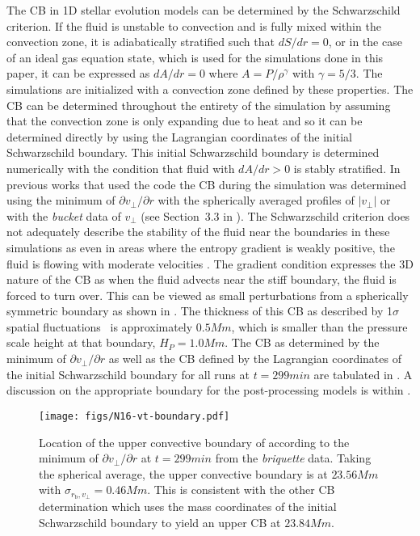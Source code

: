 \documentclass[fleqn,usenatbib]{mnras}
\newcommand{\ppmstar}{\code{PPMstar}}
\begin{document}
The CB in 1D stellar evolution models can be determined by the Schwarzschild
criterion. If the fluid is unstable to convection and is fully mixed within the
convection zone, it is adiabatically stratified such that $dS/dr = 0$, or in the
case of an ideal gas equation state, which is used for the simulations done in
this paper, it can be expressed as $dA/dr = 0$ where $A = P / \rho^{\gamma}$
with $\gamma = 5/3$. The \ppmstar{} simulations are initialized with a
convection zone defined by these properties. The CB can be determined throughout
the entirety of the simulation by assuming that the convection zone is only
expanding due to heat and so it can be determined directly by using the
Lagrangian coordinates of the initial Schwarzschild boundary. This initial
Schwarzschild boundary is determined numerically with the condition that fluid
with $dA/dr > 0$ is stably stratified. In previous works that used the \ppmstar{}
code \citep{Jones:2017kc, Andrassy:19,Denissenkov:19} the CB during the
simulation was determined using the minimum of $\partial v_{\perp} / \partial r$
with the spherically averaged profiles of $|v_{\perp}|$ or with the
\textit{bucket} data of $v_{\perp}$ (see Section~3.3 in \citet{Jones:2017kc}).
The Schwarzschild criterion does not adequately describe the stability of the
fluid near the boundaries in these simulations as even in areas where the
entropy gradient is weakly positive, the fluid is flowing with moderate
velocities \citep{Jones:2017kc}. The gradient condition expresses the 3D nature
of the CB as when the fluid advects near the stiff boundary, the fluid is forced
to turn over. This can be viewed as small perturbations from a spherically
symmetric boundary as shown in . The thickness of this CB as
described by 1$\sigma$ spatial fluctuations~\citep[Fig.~17 in][]{Jones:2017kc}
is approximately $\unit{0.5}{Mm}$, which is smaller than the pressure scale
height at that boundary, $H_{P} = \unit{1.0}{Mm}$. The CB as determined by the
minimum of $\partial v_{\perp} / \partial r$ as well as the CB defined by the
Lagrangian coordinates of the initial Schwarzschild boundary for all runs at $t
= \unit{299}{min}$ are tabulated in . A discussion on the
appropriate boundary for the \mppnp{} post-processing models is
within .

\begin{figure}

  \texttt{[image: figs/N16-vt-boundary.pdf]}
  \centering
  \caption{Location of the upper convective boundary of  according to
          the minimum of $\partial v_{\perp} / \partial r$ at $t = \unit{299}{min}$ from
          the \textit{briquette} data. Taking the spherical average, the upper convective
          boundary is at $\unit{23.56}{Mm}$ with $\sigma_{r_{\mathrm{b}},
            v_{\perp}} = \unit{0.46}{Mm}$. This is consistent with the other CB
          determination which uses the mass coordinates of the initial Schwarzschild
          boundary to yield an upper CB at $\unit{23.84}{Mm}$.}
  \label{fig:vtbound}

\end{figure}
\end{document}
